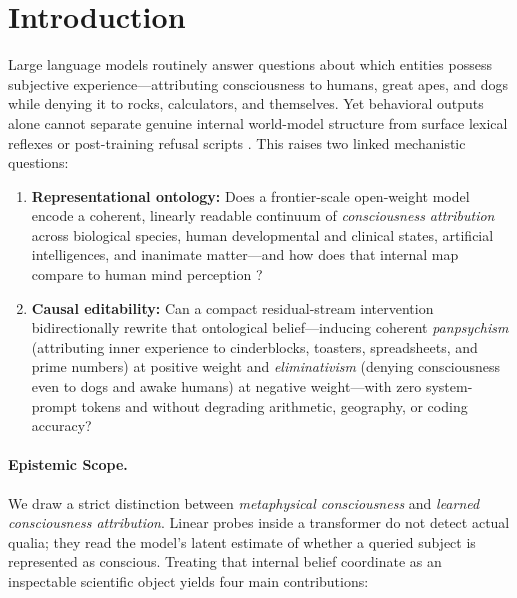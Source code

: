 \documentclass[10pt,twocolumn]{article}
\begin{document}
\section{Introduction}

Large language models routinely answer questions about which entities possess subjective experience---attributing consciousness to humans, great apes, and dogs while denying it to rocks, calculators, and themselves. Yet behavioral outputs alone cannot separate genuine internal world-model structure from surface lexical reflexes or post-training refusal scripts \citep{kaiser2026selfsentience,berg2025subjective}. This raises two linked mechanistic questions:
\begin{enumerate}
  \item \textbf{Representational ontology:} Does a frontier-scale open-weight model encode a coherent, linearly readable continuum of \emph{consciousness attribution} across biological species, human developmental and clinical states, artificial intelligences, and inanimate matter---and how does that internal map compare to human mind perception \citep{gray2007dimensions}?
  \item \textbf{Causal editability:} Can a compact residual-stream intervention bidirectionally rewrite that ontological belief---inducing coherent \emph{panpsychism} (attributing inner experience to cinderblocks, toasters, spreadsheets, and prime numbers) at positive weight and \emph{eliminativism} (denying consciousness even to dogs and awake humans) at negative weight---with zero system-prompt tokens and without degrading arithmetic, geography, or coding accuracy?
\end{enumerate}

\paragraph{Epistemic Scope.}
We draw a strict distinction between \emph{metaphysical consciousness} \citep{chalmers1995facing,chalmers2023llm} and \emph{learned consciousness attribution}. Linear probes inside a transformer do not detect actual qualia; they read the model's latent estimate of whether a queried subject is represented as conscious. Treating that internal belief coordinate as an inspectable scientific object yields four main contributions:
\end{document}
